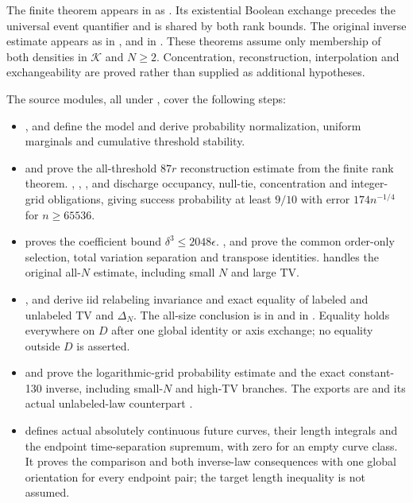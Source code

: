 \documentclass[11pt]{article}
\theoremstyle{remark}
\newcommand{\K}{\mathcal K}
\begin{document}
The finite theorem appears in  as
. Its existential Boolean
exchange precedes the universal event quantifier and is shared by both
rank bounds. The original inverse estimate appears as
 in , and
 in .
These theorems assume only membership of both densities in $\K$ and
$N\ge2$. Concentration, reconstruction, interpolation and exchangeability
are proved rather than supplied as additional hypotheses.

The source modules, all under , cover the
following steps:
\begin{itemize}
\item {},  and 
define the model and derive probability normalization, uniform marginals
and cumulative threshold stability.
\item {} and  prove the
all-threshold $87r$ reconstruction estimate from the finite rank theorem.
, , ,
 and  discharge occupancy,
null-tie, concentration and integer-grid obligations, giving success
probability at least $9/10$ with error $174n^{-1/4}$ for $n\ge65536$.
\item {} proves the coefficient bound
$\delta^3\le2048\epsilon$. , 
and  prove the common order-only selection, total
variation separation and transpose identities. 
handles the original all-$N$ estimate, including small $N$ and large TV.
\item {},  and
 derive iid relabeling invariance and exact equality
of labeled and unlabeled TV and $\Delta_N$. The all-size conclusion is
 in 
and  in
. Equality holds everywhere on $D$ after one global
identity or axis exchange; no equality outside $D$ is asserted.
\item {} and  prove
the logarithmic-grid probability estimate and the exact constant-130
inverse, including small-$N$ and high-TV branches. The exports are
 and its actual unlabeled-law
counterpart .
\item {} defines actual absolutely continuous
future curves, their length integrals and the endpoint time-separation
supremum, with zero for an empty curve class. It proves the comparison
and both inverse-law consequences with one global orientation for
every endpoint pair; the target length inequality is not assumed.
\end{itemize}
\end{document}
